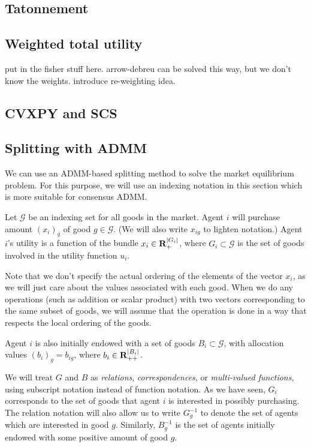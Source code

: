 \documentclass[12pt]{article}
\begin{document}
\subsection{Tatonnement}

\subsection{Weighted total utility}
put in the fisher stuff here. arrow-debreu can be solved this way, but we
don't know the weights. introduce re-weighting idea.

\subsection{CVXPY and SCS}

\subsection{Splitting with ADMM}
We can use an ADMM-based splitting method \cite{boyd2011distributed} to
solve the market equilibrium problem.
For this purpose, we will use an indexing notation in this section which is
more suitable for consensus ADMM.

Let $\mathcal{G}$ be an indexing set for all goods
in the market.
Agent $i$ will purchase amount $(x_i)_g$ of good $g \in \mathcal{G}$.
(We will also write $x_{ig}$ to lighten notation.)
Agent $i$'s utility is a function of the bundle $x_i \in {\mbox{\bf R}}_{+}^{|G_i|}$,
where $G_i \subset \mathcal{G}$ is the set of goods involved in the utility
function $u_i$.

Note that we don't specify the actual ordering of the elements
of the vector $x_i$, as we will just care about the values associated with
each good.
When we do any operations (such as addition or scalar product) with
two vectors corresponding to the same subset of goods, we will
assume that the operation is done in a way that respects the local ordering of
the goods.

Agent $i$ is also initially endowed with a set of goods
$B_i \subset \mathcal{G}$,
with allocation values $(b_i)_g = b_{ig}$, where $b_i \in {\mbox{\bf R}}_{++}^{|B_i|}$.

We will treat $G$ and $B$ as \emph{relations}, \emph{correspondences}, or
\emph{multi-valued functions},
using subscript notation instead of function notation.
As we have seen, $G_i$ corresponds to the set of goods that agent $i$ is
interested
in possibly purchasing.
The relation notation will also allow us to
write $G^{-1}_g$ to denote the set of agents which are interested in good
$g$.
Similarly, $B^{-1}_g$ is the set of agents initially endowed with some
positive amount of good $g$.
\end{document}
